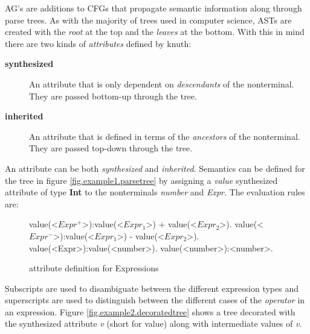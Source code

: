 AG's are additions to CFGs that propagate semantic information along through parse trees. As with the majority of trees used in computer science, ASTs are created with the \emph{root} at the top and the \emph{leaves} at the bottom. With this in mind there are two kinds of \emph{attributes} defined by knuth\cite{knuth1}:
\begin{description}
\item[\textbf{synthesized}] An attribute that is only dependent on \emph{descendants} of the nonterminal. They are passed bottom-up through the tree.
\item[\textbf{inherited}] An attribute that is defined in terms of the \emph{ancestors} of the nonterminal. They are passed top-down through the tree.
\end{description}

An attribute can be both \emph{synthesized} and \emph{inherited}. Semantics can be defined for the tree in figure \ref{fig.example1.parsetree} by assigning a \emph{value} synthesized attribute of type \textbf{Int} to the nonterminals \emph{number} and \emph{Expr}. The evaluation rules are:

\begin{figure}[H]
\begin{grammar}
value(<$Expr^+$>):value(<$Expr_1$>) + value(<$Expr_2$>). 
value(<$Expr^-$>):value(<$Expr_1$>) - value(<$Expr_2$>). 
value(<Expr>):value(<number>).
value(<number>):<number>.
\end{grammar}
\caption{attribute definition for Expressions}
\label{semantics:bnf:expr}
\end{figure}

Subscripts are used to disambiguate between the different expression types and  superscripts are used to distinguish between the different cases of the \emph{operator} in an expression. Figure \ref{fig.example2.decoratedtree} shows a tree decorated with the synthesized attribute \emph{v} (short for value) along with intermediate values of \emph{v}.

